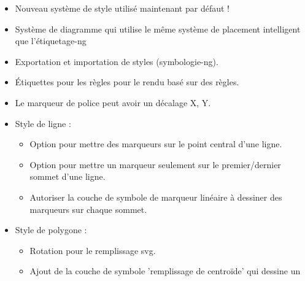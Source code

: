 \begin{itemize}[label=--]
\item Nouveau système de style utilisé maintenant par défaut !
\item Système de diagramme qui utilise le même système de placement intelligent 
que l'étiquetage-ng 
\item Exportation et importation de styles (symbologie-ng). 
\item Étiquettes pour les règles pour le rendu basé sur des règles. 
\item Le marqueur de police peut avoir un décalage X, Y. 
\item Style de ligne :
\begin{itemize}[label=--]
\item Option pour mettre des marqueurs sur le point central d'une ligne. 
\item Option pour mettre un marqueur seulement sur le premier/dernier sommet 
d'une ligne. 
\item Autoriser la couche de symbole de marqueur linéaire à dessiner des 
marqueurs sur chaque sommet. 
\end{itemize}
\item Style de polygone :
\begin{itemize}[label=--]
\item Rotation pour le remplissage svg. 
\item Ajout de la couche de symbole 'remplissage de centroïde' qui dessine un 

\end{itemize}
\end{itemize}
